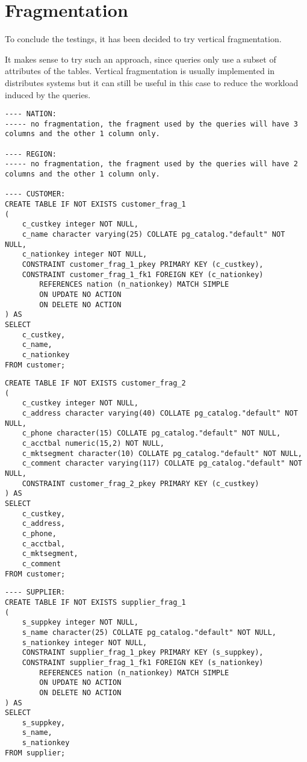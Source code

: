 

\section{Fragmentation}
\label{sec:fragmentation}

To conclude the testings, it has been decided to try vertical fragmentation.

It makes sense to try such an approach, since queries only use a subset of attributes of the tables. Vertical fragmentation is usually implemented in distributes systems but it can still be useful in this case to reduce the workload induced by the queries.

\begin{lstlisting}
---- NATION: 
----- no fragmentation, the fragment used by the queries will have 3 columns and the other 1 column only.

---- REGION:
----- no fragmentation, the fragment used by the queries will have 2 columns and the other 1 column only.

---- CUSTOMER:
CREATE TABLE IF NOT EXISTS customer_frag_1
(
    c_custkey integer NOT NULL,
    c_name character varying(25) COLLATE pg_catalog."default" NOT NULL,
    c_nationkey integer NOT NULL,
    CONSTRAINT customer_frag_1_pkey PRIMARY KEY (c_custkey),
    CONSTRAINT customer_frag_1_fk1 FOREIGN KEY (c_nationkey)
        REFERENCES nation (n_nationkey) MATCH SIMPLE
        ON UPDATE NO ACTION
        ON DELETE NO ACTION
) AS
SELECT
	c_custkey,
	c_name,
	c_nationkey
FROM customer;
\end{lstlisting}
\begin{lstlisting}
CREATE TABLE IF NOT EXISTS customer_frag_2
(
	c_custkey integer NOT NULL,
    c_address character varying(40) COLLATE pg_catalog."default" NOT NULL,
    c_phone character(15) COLLATE pg_catalog."default" NOT NULL,
    c_acctbal numeric(15,2) NOT NULL,
    c_mktsegment character(10) COLLATE pg_catalog."default" NOT NULL,
    c_comment character varying(117) COLLATE pg_catalog."default" NOT NULL,
    CONSTRAINT customer_frag_2_pkey PRIMARY KEY (c_custkey)
) AS
SELECT
	c_custkey,
	c_address,
	c_phone,
	c_acctbal,
	c_mktsegment,
	c_comment
FROM customer;
\end{lstlisting}
\begin{lstlisting}
---- SUPPLIER:
CREATE TABLE IF NOT EXISTS supplier_frag_1
(
    s_suppkey integer NOT NULL,
    s_name character(25) COLLATE pg_catalog."default" NOT NULL,
    s_nationkey integer NOT NULL,
    CONSTRAINT supplier_frag_1_pkey PRIMARY KEY (s_suppkey),
    CONSTRAINT supplier_frag_1_fk1 FOREIGN KEY (s_nationkey)
        REFERENCES nation (n_nationkey) MATCH SIMPLE
        ON UPDATE NO ACTION
        ON DELETE NO ACTION
) AS
SELECT
	s_suppkey,
	s_name,
	s_nationkey
FROM supplier;
\end{lstlisting}
